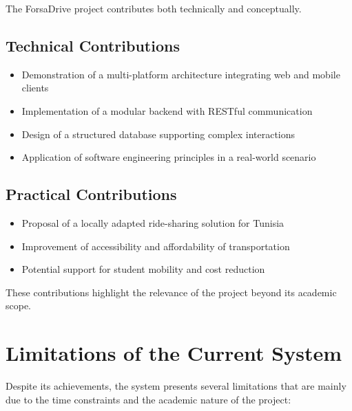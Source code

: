 The ForsaDrive project contributes both technically and conceptually.

\subsection{Technical Contributions}

\begin{itemize}[noitemsep]
    \item Demonstration of a multi-platform architecture integrating web and mobile clients
    \item Implementation of a modular backend with RESTful communication
    \item Design of a structured database supporting complex interactions
    \item Application of software engineering principles in a real-world scenario
\end{itemize}

\subsection{Practical Contributions}

\begin{itemize}[noitemsep]
    \item Proposal of a locally adapted ride-sharing solution for Tunisia
    \item Improvement of accessibility and affordability of transportation
    \item Potential support for student mobility and cost reduction
\end{itemize}

These contributions highlight the relevance of the project beyond its academic scope.

\section{Limitations of the Current System}

Despite its achievements, the system presents several limitations that are mainly due to the time constraints and the academic nature of the project:

